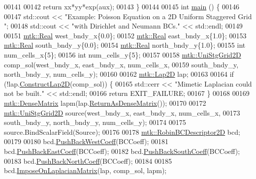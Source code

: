 \begin{DoxyCode}
00141 
00142   \textcolor{keywordflow}{return} xx*yy*exp(aux);
00143 \}
00144 
00145 \textcolor{keywordtype}{int} \hyperlink{poisson__2d_8cc_ae66f6b31b5ad750f1fe042a706a4e3d4}{main} () \{
00146 
00147   std::cout << \textcolor{stringliteral}{"Example: Poisson Equation on a 2D Uniform Staggered Grid "};
00148   std::cout << \textcolor{stringliteral}{"with Dirichlet and Neumann BCs."} << std::endl;
00149 
00151   \hyperlink{group__c01-roots_gac080bbbf5cbb5502c9f00405f894857d}{mtk::Real} west\_bndy\_x\{0.0\};
00152   \hyperlink{group__c01-roots_gac080bbbf5cbb5502c9f00405f894857d}{mtk::Real} east\_bndy\_x\{1.0\};
00153   \hyperlink{group__c01-roots_gac080bbbf5cbb5502c9f00405f894857d}{mtk::Real} south\_bndy\_y\{0.0\};
00154   \hyperlink{group__c01-roots_gac080bbbf5cbb5502c9f00405f894857d}{mtk::Real} north\_bndy\_y\{1.0\};
00155   \textcolor{keywordtype}{int} num\_cells\_x\{5\};
00156   \textcolor{keywordtype}{int} num\_cells\_y\{5\};
00157 
00158   \hyperlink{classmtk_1_1UniStgGrid2D}{mtk::UniStgGrid2D} comp\_sol(west\_bndy\_x, east\_bndy\_x, num\_cells\_x,
00159                              south\_bndy\_y, north\_bndy\_y, num\_cells\_y);
00160 
00162   \hyperlink{classmtk_1_1Lap2D}{mtk::Lap2D} lap;
00163 
00164   \textcolor{keywordflow}{if} (!lap.\hyperlink{classmtk_1_1Lap2D_a188ee8fee643463affca7de2884711b1}{ConstructLap2D}(comp\_sol)) \{
00165     std::cerr << \textcolor{stringliteral}{"Mimetic Laplacian could not be built."} << std::endl;
00166     \textcolor{keywordflow}{return} EXIT\_FAILURE;
00167   \}
00168 
00169   \hyperlink{classmtk_1_1DenseMatrix}{mtk::DenseMatrix} lapm(lap.\hyperlink{classmtk_1_1Lap2D_aaac0a22eaa2f036869b24fd420ce5761}{ReturnAsDenseMatrix}());
00170 
00172   \hyperlink{classmtk_1_1UniStgGrid2D}{mtk::UniStgGrid2D} source(west\_bndy\_x, east\_bndy\_x, num\_cells\_x,
00173                            south\_bndy\_y, north\_bndy\_y, num\_cells\_y);
00174 
00175   source.BindScalarField(Source);
00176 
00178   \hyperlink{classmtk_1_1RobinBCDescriptor2D}{mtk::RobinBCDescriptor2D} bcd;
00179 
00180   bcd.\hyperlink{classmtk_1_1RobinBCDescriptor2D_a671a38d5ea78be8f0a88ccf034d09987}{PushBackWestCoeff}(BCCoeff);
00181   bcd.\hyperlink{classmtk_1_1RobinBCDescriptor2D_a7cc1e6ca729b8b092eb73161eb244160}{PushBackEastCoeff}(BCCoeff);
00182   bcd.\hyperlink{classmtk_1_1RobinBCDescriptor2D_ad74c5d9f2c1d0359d350348ac2a7e61e}{PushBackSouthCoeff}(BCCoeff);
00183   bcd.\hyperlink{classmtk_1_1RobinBCDescriptor2D_abc6e299516af5d1c5c2d04797875b446}{PushBackNorthCoeff}(BCCoeff);
00184 
00185   bcd.\hyperlink{classmtk_1_1RobinBCDescriptor2D_a0a26693f5265fcad978e7ba84e01ed69}{ImposeOnLaplacianMatrix}(lap, comp\_sol, lapm);

\end{DoxyCode}
